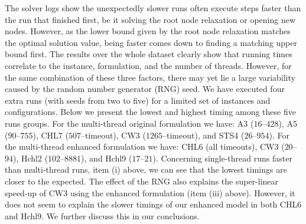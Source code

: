 \documentclass[9pt]{entcs}
\begin{document}
The solver logs show the unexpectedly slower runs often execute steps faster than the run that finished first, be it solving the root node relaxation or opening new nodes.
However, as the lower bound given by the root node relaxation matches the optimal solution value, being faster comes down to finding a matching upper bound first.
The results over the whole dataset clearly show that running times correlate to the instance, formulation, and the number of threads.
However, for the same combination of these three factors, there may yet lie a large variability caused by the random number generator (RNG) seed.
We have executed four extra runs (with seeds from two to five) for a limited set of instances and configurations.
Below we present the lowest and highest timing among these five runs groups.
For the multi-thread original formulation we have: A3 (\(16\)--\(428\)), A5 (\(90\)--\(755\)), CHL7 (\(507\)--timeout), CW3 (\(1265\)--timeout), and STS4 (\(26\)--\(954\)).
For the multi-thread enhanced formulation we have: CHL6 (all timeouts), CW3 (\(20\)--\(94\)), Hchl2 (\(102\)--\(8881\)), and Hchl9 (\(17\)--\(21\)).
Concerning single-thread runs faster than multi-thread runs, item (i) above, we can see that the lowest timings are closer to the expected.
The effect of the RNG also explains the super-linear speed-up of CW3 using the enhanced formulation (item (iii) above).
However, it does not seem to explain the slower timings of our enhanced model in both CHL6 and Hchl9.
We further discuss this in our conclusions.


\end{document}
